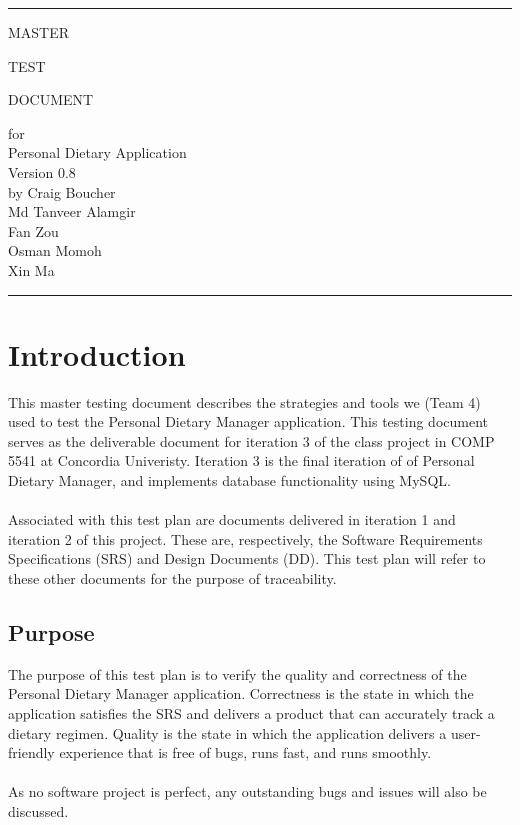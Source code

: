 \documentclass[table]{scrreprt}
\date{}
\def\myversion{0.8}
\begin{document}
    \begin{titlepage}
        \flushright\bfseries\huge
        \rule{\linewidth}{5pt}
        \par
        \vspace{1cm}
        {\Huge MASTER \par TEST \par DOCUMENT \par}
        \vspace{2cm}
        for \\
        \vspace{2cm}
        Personal Dietary Application \\
        \vspace{2cm}
        \LARGE{Version \myversion \\}
        \vspace{2cm}
        by Craig Boucher \\
        Md Tanveer Alamgir \\
        Fan Zou\\
        Osman Momoh \\
        Xin Ma
        \vspace{2cm}
        \rule{\linewidth}{5pt}
    \end{titlepage}

    \tableofcontents

    \chapter{Introduction}
    This master testing document describes the strategies and tools we (Team 4) used to test the Personal Dietary Manager application. This testing document serves as the deliverable document for iteration 3 of the class project in COMP 5541 at Concordia Univeristy. Iteration 3 is the final iteration of of Personal Dietary Manager, and implements database functionality using MySQL. \\ \\
    Associated with this test plan are documents delivered in iteration 1 and iteration 2 of this project. These are, respectively, the Software Requirements Specifications (SRS) and Design Documents (DD). This test plan will refer to these other documents for the purpose of traceability.

    \section{Purpose}
    The purpose of this test plan is to verify the quality and correctness of the Personal Dietary Manager application. Correctness is the state in which the application satisfies the SRS and delivers a product that can accurately track a dietary regimen. Quality is the state in which the application delivers a user-friendly experience that is free of bugs, runs fast, and runs smoothly. \\\\
    As no software project is perfect, any outstanding bugs and issues will also be discussed.
\end{document}
